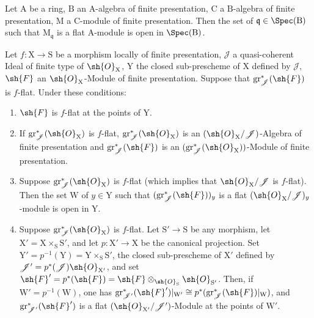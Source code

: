 \begin{corollary}[11.3.3]
\label{IV.11.3.3}
Let $\mathrm{A}$ be a ring, $\mathrm{B}$ an $\mathrm{A}$-algebra of finite presentation, $\mathrm{C}$ a $\mathrm{B}$-algebra of finite presentation, $\mathrm{M}$ a $\mathrm{C}$-module of finite presentation. Then the set of $\mathfrak{q}\in\Spec(\mathrm{B})$ such that $\mathrm{M}_\mathfrak{q}$ is a flat $\mathrm{A}$-module is open in $\Spec(\mathrm{B})$.
\end{corollary}

\begin{proposition}[11.3.4]
\label{IV.11.3.4}
Let $f:\mathrm{X}\to\mathrm{S}$ be a morphism locally of finite presentation, $\mathscr{J}$ a quasi-coherent Ideal of finite type of $\sh{O}_\mathrm{X}$, $\mathrm{Y}$ the closed sub-prescheme of $\mathrm{X}$ defined by $\mathscr{J}$, $\sh{F}$ an $\sh{O}_\mathrm{X}$-Module of finite presentation. Suppose that $\operatorname{gr}^*_\mathscr{J}(\sh{F})$ is $f$-flat. Under these conditions:
\begin{enumerate}[label=\emph{(\roman*)}]
  \item $\sh{F}$ is $f$-flat at the points of $\mathrm{Y}$.
  \item If $\operatorname{gr}^*_\mathscr{J}(\sh{O}_\mathrm{X})$ is $f$-flat, $\operatorname{gr}^*_\mathscr{J}(\sh{O}_\mathrm{X})$ is an $(\sh{O}_\mathrm{X}/\mathscr{J})$-Algebra of finite presentation and $\operatorname{gr}^*_\mathscr{J}(\sh{F})$ is an $(\operatorname{gr}^*_\mathscr{J}(\sh{O}_\mathrm{X}))$-Module of finite presentation.
  \item Suppose $\operatorname{gr}^*_\mathscr{J}(\sh{O}_\mathrm{X})$ is $f$-flat (which implies that $\sh{O}_\mathrm{X}/\mathscr{J}$ is $f$-flat). Then the set $\mathrm{W}$ of $y\in\mathrm{Y}$ such that $(\operatorname{gr}^*_\mathscr{J}(\sh{F}))_y$ is a flat $(\sh{O}_\mathrm{X}/\mathscr{J})_y$-module is open in $\mathrm{Y}$.
  \item Suppose $\operatorname{gr}^*_\mathscr{J}(\sh{O}_\mathrm{X})$ is $f$-flat. Let $\mathrm{S}'\to\mathrm{S}$ be any morphism, let $\mathrm{X}'=\mathrm{X}\times_\mathrm{S}\mathrm{S}'$, and let $p:\mathrm{X}'\to\mathrm{X}$ be the canonical projection. Set $\mathrm{Y}'=p^{-1}(\mathrm{Y})=\mathrm{Y}\times_\mathrm{S}\mathrm{S}'$, the closed sub-prescheme of $\mathrm{X}'$ defined by $\mathscr{J}'=p^*(\mathscr{J})\sh{O}_{\mathrm{X}'}$, and set $\sh{F}'=p^*(\sh{F})=\sh{F}\otimes_{\sh{O}_\mathrm{S}}\sh{O}_{\mathrm{S}'}$. Then, if $\mathrm{W}'=p^{-1}(\mathrm{W})$, one has $\operatorname{gr}^*_{\mathscr{J}'}(\sh{F}')|_{\mathrm{W}'}\cong p^*(\operatorname{gr}^*_\mathscr{J}(\sh{F})|_\mathrm{W})$, and $\operatorname{gr}^*_{\mathscr{J}'}(\sh{F}')$ is a flat $(\sh{O}_{\mathrm{X}'}/\mathscr{J}')$-Module at the points of $\mathrm{W}'$.
\end{enumerate}
\end{proposition}

